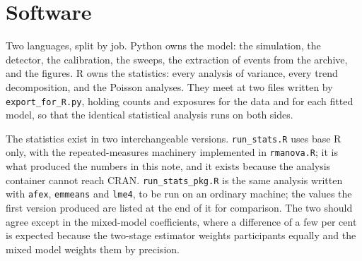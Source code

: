 \documentclass[a4paper,11pt]{article}
\newcommand{\1}{\mathbbm{1}}
\begin{document}
\section{Software}
\label{sec:software}

Two languages, split by job. Python owns the model: the simulation, the detector, the
calibration, the sweeps, the extraction of events from the archive, and the figures. R
owns the statistics: every analysis of variance, every trend decomposition, and the
Poisson analyses. They meet at two files written by \texttt{export\_for\_R.py}, holding
counts and exposures for the data and for each fitted model, so that the identical
statistical analysis runs on both sides.

The statistics exist in two interchangeable versions. \texttt{run\_stats.R} uses base R
only, with the repeated-measures machinery implemented in \texttt{rmanova.R}; it is what
produced the numbers in this note, and it exists because the analysis container cannot
reach CRAN. \texttt{run\_stats\_pkg.R} is the same analysis written with \texttt{afex},
\texttt{emmeans} and \texttt{lme4}, to be run on an ordinary machine; the values the
first version produced are listed at the end of it for comparison. The two should agree
except in the mixed-model coefficients, where a difference of a few per cent is expected
because the two-stage estimator weights participants equally and the mixed model weights
them by precision.
\end{document}
